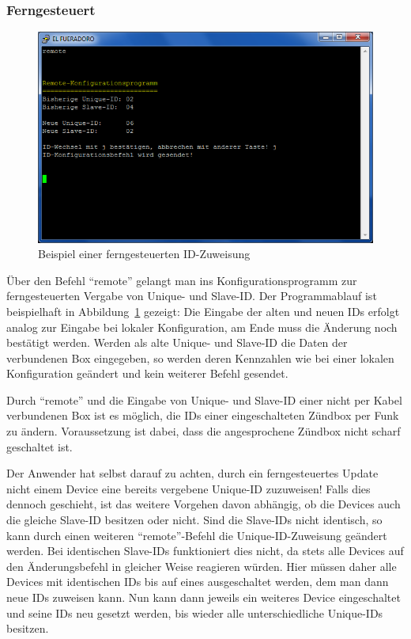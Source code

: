\documentclass[pdftex, parskip, numbers=noenddot, toc=listof]{scrbook}
\begin{document}
	\subsubsection{Ferngesteuert}
	\label{subsec:remoteconf}

	\begin{figure}
		\centering
		\includegraphics[width=.8\textwidth]{Bilder/remote}
		\caption{Beispiel einer ferngesteuerten ID-Zuweisung}
		\label{fig:remote}
	\end{figure}

	Über den Befehl \enquote{remote} gelangt man ins Konfigurationsprogramm zur ferngesteuerten Vergabe von Unique- und Slave-ID. Der Programmablauf ist beispielhaft in Abbildung~\ref{fig:remote} gezeigt: Die Eingabe der alten und neuen IDs erfolgt analog zur Eingabe bei lokaler Konfiguration, am Ende muss die Änderung noch bestätigt werden. Werden als alte Unique- und Slave-ID die Daten der verbundenen Box eingegeben, so werden deren Kennzahlen wie bei einer lokalen Konfiguration geändert und kein weiterer Befehl gesendet.

	Durch \enquote{remote} und die Eingabe von Unique- und Slave-ID einer nicht per Kabel verbundenen Box ist es möglich, die IDs einer eingeschalteten Zündbox per Funk zu ändern. Voraussetzung ist dabei, dass die angesprochene Zündbox nicht scharf geschaltet ist.

	Der Anwender hat selbst darauf zu achten, durch ein ferngesteuertes Update nicht einem Device eine bereits vergebene Unique-ID zuzuweisen! Falls dies dennoch geschieht, ist das weitere Vorgehen davon abhängig, ob die Devices auch die gleiche Slave-ID besitzen oder nicht. Sind die Slave-IDs nicht identisch, so kann durch einen weiteren \enquote{remote}-Befehl die Unique-ID-Zuweisung geändert werden. Bei identischen Slave-IDs funktioniert dies nicht, da stets alle Devices auf den Änderungsbefehl in gleicher Weise reagieren würden. Hier müssen daher alle Devices mit identischen IDs bis auf eines ausgeschaltet werden, dem man dann neue IDs zuweisen kann. Nun kann dann jeweils ein weiteres Device eingeschaltet und seine IDs neu gesetzt werden, bis wieder alle unterschiedliche Unique-IDs besitzen.
\end{document}
